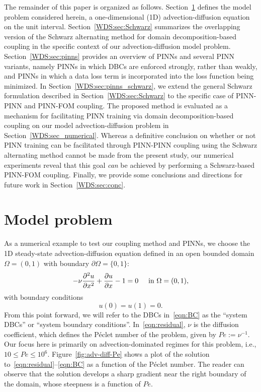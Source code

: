 \documentclass[oneside,final]{csri23}
\begin{document}
The remainder of this paper is organized as follows. Section~\ref{WDS:sec:addiff} defines the model problem considered herein, a one-dimensional (1D) advection-diffusion equation on the unit interval. Section~\ref{WDS:sec:Schwarz} summarizes the overlapping version of the Schwarz alternating method for domain decomposition-based coupling in the specific context of our advection-diffusion model problem. Section~\ref{WDS:sec:pinns} provides an overview of PINNs and several PINN variants, namely PINNs in which DBCs are enforced strongly, rather than weakly, and PINNs in which a data loss term is incorporated into the loss function being minimized.  In Section~\ref{WDS:sec:pinns_schwarz}, we extend the general Schwarz formulation described in Section~\ref{WDS:sec:Schwarz} to the specific case of PINN-PINN and PINN-FOM coupling.  The proposed method is evaluated as a mechanism for facilitating PINN training via domain decomposition-based coupling on our model advection-diffusion problem in Section~\ref{WDS:sec_numerical}.  
Whereas a definitive conclusion on whether or not
PINN training can be facilitated through 
PINN-PINN coupling using the Schwarz alternating method cannot be made from the present study, our numerical experiments reveal that 
this goal \textit{can} be achieved by performing a Schwarz-based PINN-FOM coupling.
Finally, we provide some conclusions and directions for future work in Section~\ref{WDS:sec:conc}.


\section{Model problem}\label{WDS:sec:addiff}

As a numerical example to test our coupling method and PINNs, we choose the 1D steady-state advection-diffusion equation defined in an open bounded domain $\Omega = (0,1)$ 
with boundary $\partial \Omega = \{ 0, 1\}$:
\begin{equation}
	-{\nu}\frac{\partial^2 u}{\partial x^2}+\frac{\partial u}{\partial x}-1=0 \hspace{0.5cm} \text{in } \Omega = (0,1),
    \label{eqn:residual}
\end{equation}
with boundary conditions
\begin{equation}
	u(0)=u(1)=0.
    \label{eqn:BC}
\end{equation}
From this point forward, we will refer to the DBCs in~\eqref{eqn:BC} as the ``system DBCs'' or ``system boundary conditions''. In~\eqref{eqn:residual}, $\nu$ is the diffusion coefficient, which defines the P\'{e}clet number of the problem, given by $Pe:=\nu^{-1}$. Our focus here is primarily on advection-dominated regimes for this problem, i.e., $10 \leq Pe \leq 10^{6}$. Figure~\ref{fig:adv-diff-Pe} shows a plot of the solution to~\eqref{eqn:residual}--\eqref{eqn:BC} as a function of the P\'{e}clet number. The reader can observe that the solution develops a sharp gradient near the right boundary of the domain, whose steepness is a function of $Pe$.  
\end{document}
